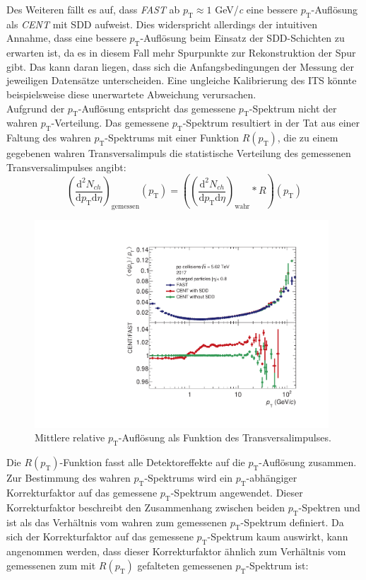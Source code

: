 \documentclass[12pt,a4paper]{report}
\begin{document}
Des Weiteren fällt es auf, dass \textit{FAST} ab $p_{\mathrm{T}} \approx 1$ GeV/\textit{c} eine bessere $p_{\mathrm{T}}$-Auflösung als \textit{CENT} mit SDD aufweist. Dies widerspricht allerdings der intuitiven Annahme, dass eine bessere $p_{\mathrm{T}}$-Auflösung beim Einsatz der SDD-Schichten zu erwarten ist, da es in diesem Fall mehr Spurpunkte zur Rekonstruktion der Spur gibt. Das kann daran liegen, dass sich die Anfangsbedingungen der Messung der jeweiligen Datensätze unterscheiden. Eine ungleiche Kalibrierung des ITS könnte beispielsweise diese unerwartete Abweichung verursachen.\\
Aufgrund der $p_{\mathrm{T}}$-Auflösung entspricht das gemessene $p_{\mathrm{T}}$-Spektrum nicht der wahren $p_{\mathrm{T}}$-Verteilung. Das gemessene $p_{\mathrm{T}}$-Spektrum resultiert in der Tat aus einer Faltung des wahren $p_{\mathrm{T}}$-Spektrums mit einer Funktion $R(p_{\mathrm{T}})$, die zu einem gegebenen wahren Transversalimpuls die statistische Verteilung des gemessenen Transversalimpulses angibt:
\begin{equation} 
  \left(\dfrac{\mathrm{d}^2 N_{ch}}{\mathrm{d}p_{\mathrm{T}} \mathrm{d}\eta} \right)_{\mathrm{gemessen}} (p_{\mathrm{T}}) = \left(\left(\dfrac{\mathrm{d}^2 N_{ch}}{\mathrm{d}p_{\mathrm{T}} \mathrm{d}\eta} \right)_{\mathrm{wahr}} *R \right)(p_{\mathrm{T}})
\end{equation}
\begin{figure}
\centering
\includegraphics[width=11cm]{Plots/pTResolution.pdf}  
\caption{Mittlere relative $p_{\mathrm{T}}$-Auflösung als Funktion des Transversalimpulses.}
\label{RelativePtResolution}
\end{figure}
\hspace{-0.25cm} Die $R(p_{\mathrm{T}})$-Funktion fasst alle Detektoreffekte auf die $p_{\mathrm{T}}$-Auflösung zusammen. Zur Bestimmung des wahren $p_{\mathrm{T}}$-Spektrums wird ein $p_{\mathrm{T}}$-abhängiger Korrekturfaktor auf das gemessene $p_{\mathrm{T}}$-Spektrum angewendet. Dieser Korrekturfaktor beschreibt den Zusammenhang zwischen beiden $p_{\mathrm{T}}$-Spektren und ist als das Verhältnis vom wahren zum gemessenen $p_{\mathrm{T}}$-Spektrum definiert. Da sich der Korrekturfaktor auf das gemessene $p_{\mathrm{T}}$-Spektrum kaum auswirkt, kann angenommen werden, dass dieser Korrekturfaktor ähnlich zum Verhältnis vom gemessenen zum mit $R(p_{\mathrm{T}})$ gefalteten gemessenen $p_{\mathrm{T}}$-Spektrum ist:
\end{document}
